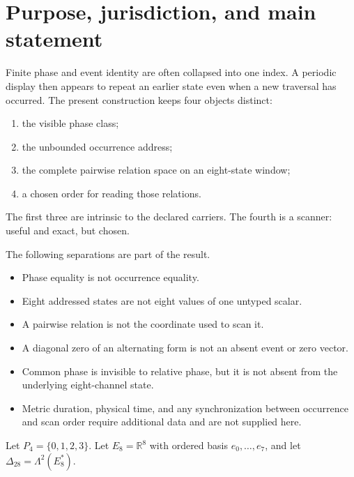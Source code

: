 \documentclass[11pt,letterpaper]{article}
\theoremstyle{relationstyle}
\newcommand{\R}{\mathbb{R}}
\newcommand{\wedgeTwo}{\Lambda^2}
\begin{document}
\tableofcontents
\clearpage

\section{Purpose, jurisdiction, and main statement}

Finite phase and event identity are often collapsed into one index.  A periodic display then appears to repeat an earlier state even when a new traversal has occurred.  The present construction keeps four objects distinct:
\begin{enumerate}
  \item the visible phase class;
  \item the unbounded occurrence address;
  \item the complete pairwise relation space on an eight-state window;
  \item a chosen order for reading those relations.
\end{enumerate}

The first three are intrinsic to the declared carriers.  The fourth is a scanner: useful and exact, but chosen.

\begin{boundarybox}
The following separations are part of the result.
\begin{itemize}
  \item Phase equality is not occurrence equality.
  \item Eight addressed states are not eight values of one untyped scalar.
  \item A pairwise relation is not the coordinate used to scan it.
  \item A diagonal zero of an alternating form is not an absent event or zero vector.
  \item Common phase is invisible to relative phase, but it is not absent from the underlying eight-channel state.
  \item Metric duration, physical time, and any synchronization between occurrence and scan order require additional data and are not supplied here.
\end{itemize}
\end{boundarybox}

Let $P_4=\{0,1,2,3\}$.  Let $E_8=\R^8$ with ordered basis $e_0,\ldots,e_7$, and let $\Delta_{28}=\wedgeTwo(E_8^*)$.
\end{document}
